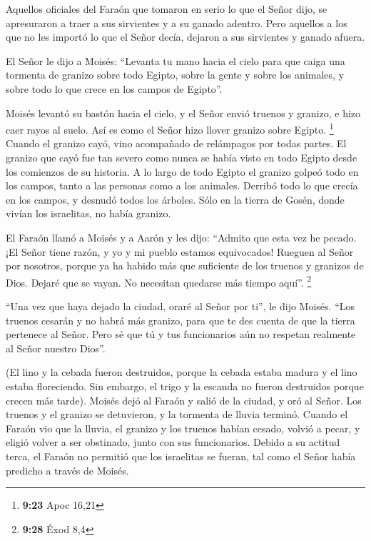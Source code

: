  Aquellos oficiales del Faraón que tomaron en serio lo
que el Señor dijo, se apresuraron a traer a sus sirvientes y a su ganado
adentro.  Pero aquellos a los que no les importó lo que
el Señor decía, dejaron a sus sirvientes y ganado afuera.

 El Señor le dijo a Moisés: ``Levanta tu mano hacia el
cielo para que caiga una tormenta de granizo sobre todo Egipto, sobre la
gente y sobre los animales, y sobre todo lo que crece en los campos de
Egipto''.

 Moisés levantó su bastón hacia el cielo, y el Señor
envió truenos y granizo, e hizo caer rayos al suelo. Así es como el
Señor hizo llover granizo sobre Egipto. \footnote{\textbf{9:23} Apoc
  16,21}  Cuando el granizo cayó, vino acompañado de
relámpagos por todas partes. El granizo que cayó fue tan severo como
nunca se había visto en todo Egipto desde los comienzos de su historia.
 A lo largo de todo Egipto el granizo golpeó todo en los
campos, tanto a las personas como a los animales. Derribó todo lo que
crecía en los campos, y desnudó todos los árboles.  Sólo
en la tierra de Gosén, donde vivían los israelitas, no había granizo.

 El Faraón llamó a Moisés y a Aarón y les dijo: ``Admito
que esta vez he pecado. ¡El Señor tiene razón, y yo y mi pueblo estamos
equivocados!  Rueguen al Señor por nosotros, porque ya ha
habido más que suficiente de los truenos y granizos de Dios. Dejaré que
se vayan. No necesitan quedarse más tiempo aquí''. \footnote{\textbf{9:28}
  Éxod 8,4}

 ``Una vez que haya dejado la ciudad, oraré al Señor por
ti'', le dijo Moisés. ``Los truenos cesarán y no habrá más granizo, para
que te des cuenta de que la tierra pertenece al Señor. 
Pero sé que tú y tus funcionarios aún no respetan realmente al Señor
nuestro Dios''.

 (El lino y la cebada fueron destruidos, porque la cebada
estaba madura y el lino estaba floreciendo.  Sin embargo,
el trigo y la escanda no fueron destruidos porque crecen más tarde).
 Moisés dejó al Faraón y salió de la ciudad, y oró al
Señor. Los truenos y el granizo se detuvieron, y la tormenta de lluvia
terminó.  Cuando el Faraón vio que la lluvia, el granizo
y los truenos habían cesado, volvió a pecar, y eligió volver a ser
obstinado, junto con sus funcionarios.  Debido a su
actitud terca, el Faraón no permitió que los israelitas se fueran, tal
como el Señor había predicho a través de Moisés.

